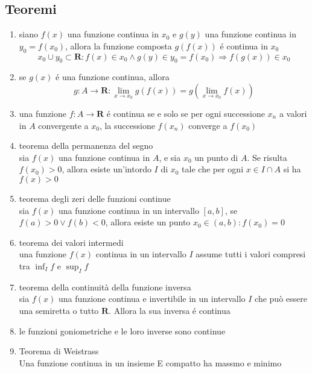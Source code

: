 \documentclass{exam}
\begin{document}
  \subsection{Teoremi}
    \begin{enumerate}
      \item
        siano $f(x)$ una funzione continua in $x_{0}$ e
        $g(y)$ una funzione continua in $y_{0}=f(x_{0})$, allora
        la funzione composta $g(f(x))$ \'e continua in $x_{0}$
        \begin{displaymath}
          x_{0}\cup y_{0}\subset \mathbf{R}:f(x) \in x_{0} \land g(y) 
          \in y_{0}=f(x_{0}) \Rightarrow f(g(x))\in x_{0}
        \end{displaymath}
      \item
        se $g(x)$ \'e una funzione continua, allora
        \begin{displaymath}
          g:A\rightarrow \mathbf{R}:\lim_{x\to x_{0}}g(f(x))=g(\lim_{x\to x_{0}}f(x))
        \end{displaymath}
      \item
        una funzione $f:A\rightarrow \mathbf{R}$ \'e continua se e solo se per ogni successione $x_{n}$ a valori in $A$ convergente a $x_{0}$, la successione $f(x_{n})$ converge a $f(x_{0})$
      \item{teorema della permanenza del segno}\\
        sia $f(x)$ una funzione continua in $A$, e sia $x_{0}$ un punto di $A$. Se risulta $f(x_{0})>0$, allora esiste un'intordo $I$ di $x_{0}$ tale che per ogni $x\in I\cap A$ si ha $f(x)>0$
      \item{teorema degli zeri delle funzioni continue}\\
        sia $f(x)$ una funzione continua in un intervallo $[a,b]$, se $f(a)>0 \lor f(b)<0$, allora esiste un punto $x_{0}\in (a,b):f(x_{0})=0$
      \item{teorema dei valori intermedi}\\
        una funzione $f(x)$ continua in un intervallo $I$ assume tutti i valori compresi tra $\inf_{I}f$ e $\sup_{I}f$
      \item{teorema della continuità della funzione inversa}\\
        sia $f(x)$ una funzione continua e invertibile in un intervallo $I$ che può essere una semiretta o tutto $\mathbf{R}$. Allora la sua inversa \'e continua
      \item le funzioni goniometriche e le loro inverse sono continue
      \item{Teorema di Weistrass}\\
        Una funzione continua in un insieme E compatto ha massmo e minimo
    \end{enumerate}
  \newpage
\end{document}
